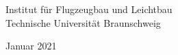  
 \begin{center}
\par\bigskip
\par\bigskip	
\par\bigskip\par\bigskip	
\par\bigskip
Institut für Flugzeugbau und Leichtbau\\
Technische Universität Braunschweig
\par\bigskip	
 Januar 2021\\
\end{center}

